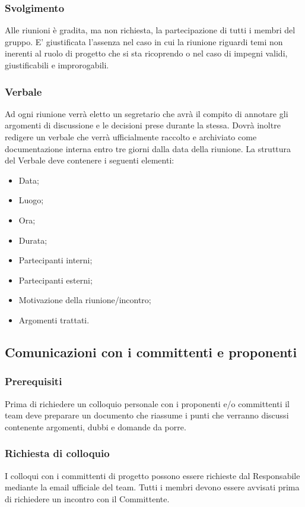 \subsubsection{Svolgimento}
\label{3.3.2}
Alle riunioni è gradita, ma non richiesta, la partecipazione di tutti i membri del gruppo. E' giustificata l'assenza nel caso in cui la riunione riguardi temi non inerenti al ruolo di progetto che si sta ricoprendo o nel caso di impegni validi, giustificabili e improrogabili.

\subsubsection{Verbale}
\label{3.3.3}
Ad ogni riunione verrà eletto un segretario che avrà il compito di annotare gli argomenti di discussione e le decisioni prese durante la stessa.
Dovrà inoltre redigere un verbale che verrà ufficialmente raccolto e archiviato come documentazione interna entro tre giorni dalla data della riunione.
La struttura del Verbale deve contenere i seguenti elementi:
\begin{itemize}
\item Data;
\item Luogo;
\item Ora;
\item Durata;
\item Partecipanti interni;
\item Partecipanti esterni;
\item Motivazione della riunione/incontro;
\item Argomenti trattati.
\end{itemize}

\subsection{Comunicazioni con i committenti e proponenti}
\label{3.4}

\subsubsection{Prerequisiti}
\label{3.4.1}
Prima di richiedere un colloquio personale con i proponenti e/o committenti il team deve preparare un documento che riassume i punti che verranno discussi contenente argomenti, dubbi e domande da porre.

\subsubsection{Richiesta di colloquio}
\label{3.4.2}
I colloqui con i committenti di progetto possono essere richieste dal Responsabile mediante la email ufficiale del team. Tutti i membri devono essere avvisati prima di richiedere un incontro con il Committente.

